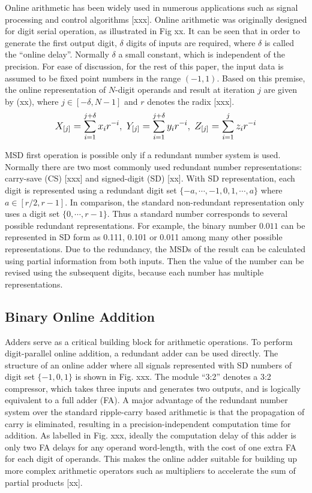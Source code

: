 \documentclass[journal]{IEEEtran}
\begin{document}
Online arithmetic has been widely used in numerous applications such as signal processing and control algorithms [xxx]. Online arithmetic was originally designed for digit serial operation, as illustrated in Fig xx. It can be seen that in order to generate the first output digit, $\delta$ digits of inputs are required, where $\delta$ is called the ``online delay''. Normally $\delta$ a small constant, which is independent of the precision. For ease of discussion, for the rest of this paper, the input data is assumed to be fixed point numbers in the range $(-1,1)$. Based on this premise, the online representation of $N$-digit operands and result at iteration $j$ are given by (xx), where $j\in[-\delta,N-1]$ and $r$ denotes the radix [xxx].
\begin{eqnarray}\label{Eq:Online_Operands}
\footnotesize
  X_{[j]}=\sum_{i=1}^{j+\delta}x_ir^{-i},~Y_{[j]}=\sum_{i=1}^{j+\delta}y_ir^{-i},~Z_{[j]}=\sum_{i=1}^{j}z_ir^{-i}
\normalsize
\end{eqnarray}

MSD first operation is possible only if a redundant number system is used. Normally there are two most commonly used redundant number representations: carry-save (CS) [xxx] and signed-digit (SD) [xx]. With SD representation, each digit is represented using a redundant digit set $\{-a,\cdots,-1,0,1,\cdots,a\}$ where $a\in[r/2,r-1]$. In comparison, the standard non-redundant representation only uses a digit set $\{0,\cdots, r−1\}$. Thus a standard number corresponds to several possible redundant representations. For example, the binary number $0.011$ can be represented in SD form as 0.111, 0.101 or 0.011 among many other possible representations.
Due to the redundancy, the MSDs of the result can be calculated using partial information from both inputs. Then the value of the number can be revised using the subsequent digits, because each number has multiple representations.

\subsection{Binary Online Addition}

Adders serve as a critical building block for arithmetic operations. To perform digit-parallel online addition, a redundant adder can be used directly. The structure of an online adder where all signals represented with SD numbers of digit set $\{−1,0,1\}$ is shown in Fig. xxx. The module ``3:2'' denotes a 3:2 compressor, which takes three inputs and generates two outputs, and is logically equivalent to a full adder (FA). A major advantage of the redundant number system over the standard ripple-carry based arithmetic is that the propagation of carry is eliminated, resulting in a precision-independent computation time for addition. As labelled in Fig. xxx, ideally the computation delay of this adder is only two FA delays for any operand word-length, with the cost of one extra FA for each digit of operands. This makes the online adder suitable for building up more complex arithmetic operators such as multipliers to accelerate the sum of partial products [xx].
\end{document}
